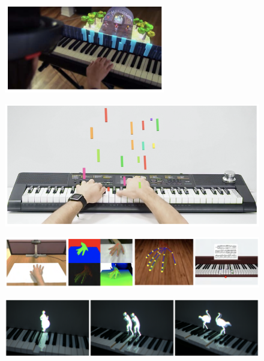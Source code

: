 \documentclass[manuscript,screen]{acmart}
\begin{document}
\begin{figure}
    \centering
    \includegraphics[width=7cm]{figures/daspiano.png}
    \caption{\cite{das2017music} }
    \label{fig:daspiano}
\end{figure}

\begin{figure}
    \centering
    \includegraphics[width=15cm]{figures/arpianotrujano.png}
    \caption{\cite{trujano2018arpiano} }
    \label{fig:View from the HeadMounted}
\end{figure}

\begin{figure}
    \centering
    \includegraphics[width=15cm]{figures/lianghandtrack.png}
    \caption{\cite{liang2016barehanded} }
    \label{fig:View from the HeadMounted}
\end{figure}

\begin{figure}
    \centering
    \includegraphics[width=15cm]{figures/xiaoandante.png}
    \caption{\cite{xiao2014andante} }
    \label{fig:View from the HeadMounted}
\end{figure}
\end{document}
